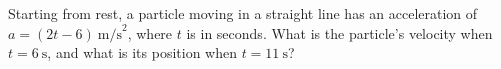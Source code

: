 Starting from rest, a particle moving in a straight line has an acceleration of $a = (2t - 6) \ \text{m/s}^2$, where $t$ is in seconds. What is the particle's velocity when $t = 6 \ \text{s}$, and what is its position when $t = 11 \ \text{s}$?